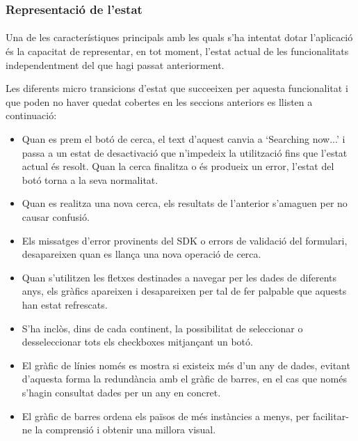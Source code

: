 \subsubsection{Representació de l'estat}

\paragraph{}
Una de les característiques principals amb les quals s'ha intentat dotar l'aplicació és la capacitat de representar, en tot moment, l'estat actual de les funcionalitats independentment del que hagi passat anteriorment.

Les diferents micro transicions d'estat que succeeixen per aquesta funcionalitat i que poden no haver quedat cobertes en les seccions anteriors es llisten a continuació:

\begin{itemize}
    \item Quan es prem el botó de cerca, el text d'aquest canvia a `Searching now...' i passa a un estat de desactivació que n'impedeix la utilització fins que l'estat actual és resolt. Quan la cerca finalitza o és produeix un error, l'estat del botó torna a la seva normalitat.
    \item Quan es realitza una nova cerca, els resultats de l'anterior s'amaguen per no causar confusió.
    \item Els missatges d'error provinents del SDK o errors de validació del formulari, desapareixen quan es llança una nova operació de cerca.
    \item Quan s'utilitzen les fletxes destinades a navegar per les dades de diferents anys, els gràfics apareixen i desapareixen per tal de fer palpable que aquests han estat refrescats.
    \item S'ha inclòs, dins de cada continent, la possibilitat de seleccionar o desseleccionar tots els checkboxes mitjançant un botó.
    \item El gràfic de línies només es mostra si existeix més d'un any de dades, evitant d’aquesta forma la redundància amb el gràfic de barres, en el cas que només s’hagin consultat dades per un any en concret.
    \item El gràfic de barres ordena els països de més instàncies a menys, per facilitar-ne la comprensió i obtenir una millora visual.
\end{itemize}

